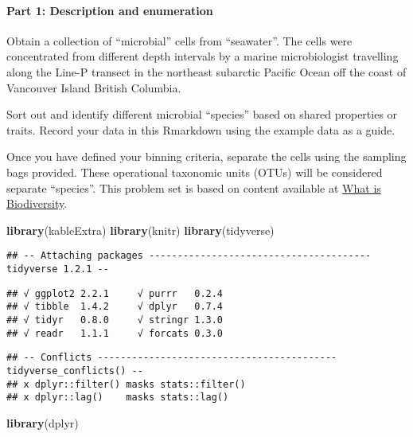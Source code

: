 \documentclass[]{article}
\newenvironment{Shaded}{\begin{snugshade}}{\end{snugshade}}
\newcommand{\KeywordTok}[1]{\textcolor[rgb]{0.13,0.29,0.53}{\textbf{#1}}}
\newcommand{\NormalTok}[1]{#1}
\let\oldparagraph\paragraph
\renewcommand{\paragraph}[1]{\oldparagraph{#1}\mbox{}}
\begin{document}
\paragraph{Part 1: Description and
enumeration}\label{part-1-description-and-enumeration}

Obtain a collection of ``microbial'' cells from ``seawater''. The cells
were concentrated from different depth intervals by a marine
microbiologist travelling along the Line-P transect in the northeast
subarctic Pacific Ocean off the coast of Vancouver Island British
Columbia.

Sort out and identify different microbial ``species'' based on shared
properties or traits. Record your data in this Rmarkdown using the
example data as a guide.

Once you have defined your binning criteria, separate the cells using
the sampling bags provided. These operational taxonomic units (OTUs)
will be considered separate ``species''. This problem set is based on
content available at \href{http://cnx.org/content/m12179/latest/}{What
is Biodiversity}.

\begin{Shaded}
\begin{Highlighting}[]
\KeywordTok{library}\NormalTok{(kableExtra)}
\KeywordTok{library}\NormalTok{(knitr)}
\KeywordTok{library}\NormalTok{(tidyverse)}
\end{Highlighting}
\end{Shaded}

\begin{verbatim}
## -- Attaching packages --------------------------------------- tidyverse 1.2.1 --
\end{verbatim}

\begin{verbatim}
## √ ggplot2 2.2.1     √ purrr   0.2.4
## √ tibble  1.4.2     √ dplyr   0.7.4
## √ tidyr   0.8.0     √ stringr 1.3.0
## √ readr   1.1.1     √ forcats 0.3.0
\end{verbatim}

\begin{verbatim}
## -- Conflicts ------------------------------------------ tidyverse_conflicts() --
## x dplyr::filter() masks stats::filter()
## x dplyr::lag()    masks stats::lag()
\end{verbatim}

\begin{Shaded}
\begin{Highlighting}[]
\KeywordTok{library}\NormalTok{(dplyr)}
\end{Highlighting}
\end{Shaded}
\end{document}
